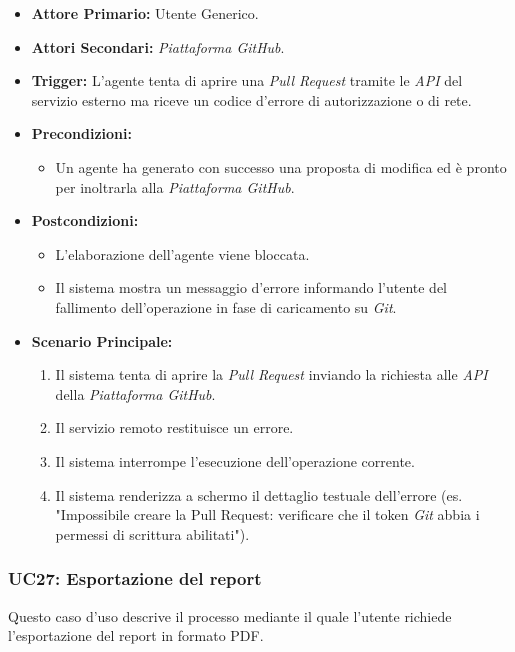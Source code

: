 \documentclass[12pt, a4paper]{article}
\begin{document}
\begin{itemize}
    \item \textbf{Attore Primario:} Utente Generico.
    \item \textbf{Attori Secondari:} \textit{Piattaforma GitHub}.
    \item \textbf{Trigger:} L'agente tenta di aprire una \textit{Pull Request} tramite le \textit{API} del servizio esterno ma riceve un codice d'errore di autorizzazione o di rete.
    \item \textbf{Precondizioni:}
    \begin{itemize}
        \item Un agente ha generato con successo una proposta di modifica ed è pronto per inoltrarla alla \textit{Piattaforma GitHub}.
    \end{itemize}
    \item \textbf{Postcondizioni:}
    \begin{itemize}
        \item L'elaborazione dell'agente viene bloccata.
        \item Il sistema mostra un messaggio d'errore informando l'utente del fallimento dell'operazione in fase di caricamento su \textit{Git}.
    \end{itemize}
    \item \textbf{Scenario Principale:}
    \begin{enumerate}
        \item Il sistema tenta di aprire la \textit{Pull Request} inviando la richiesta alle \textit{API} della \textit{Piattaforma GitHub}.
        \item Il servizio remoto restituisce un errore.
        \item Il sistema interrompe l'esecuzione dell'operazione corrente.
        \item Il sistema renderizza a schermo il dettaglio testuale dell'errore (es. "Impossibile creare la Pull Request: verificare che il token \textit{Git} abbia i permessi di scrittura abilitati").
    \end{enumerate}
\end{itemize}

\subsubsection{UC27: Esportazione del report}\label{uc:27}
Questo caso d'uso descrive il processo mediante il quale l'utente richiede l'esportazione del report in formato PDF.
\end{document}
